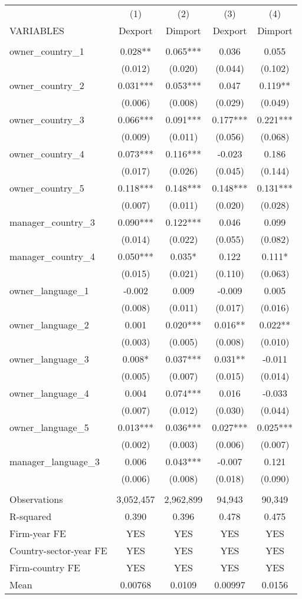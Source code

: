 \begin{tabular}{lcccc} \hline
 & (1) & (2) & (3) & (4) \\
VARIABLES & Dexport & Dimport & Dexport & Dimport \\ \hline
 &  &  &  &  \\
owner\_country\_1 & 0.028** & 0.065*** & 0.036 & 0.055 \\
 & (0.012) & (0.020) & (0.044) & (0.102) \\
owner\_country\_2 & 0.031*** & 0.053*** & 0.047 & 0.119** \\
 & (0.006) & (0.008) & (0.029) & (0.049) \\
owner\_country\_3 & 0.066*** & 0.091*** & 0.177*** & 0.221*** \\
 & (0.009) & (0.011) & (0.056) & (0.068) \\
owner\_country\_4 & 0.073*** & 0.116*** & -0.023 & 0.186 \\
 & (0.017) & (0.026) & (0.045) & (0.144) \\
owner\_country\_5 & 0.118*** & 0.148*** & 0.148*** & 0.131*** \\
 & (0.007) & (0.011) & (0.020) & (0.028) \\
manager\_country\_3 & 0.090*** & 0.122*** & 0.046 & 0.099 \\
 & (0.014) & (0.022) & (0.055) & (0.082) \\
manager\_country\_4 & 0.050*** & 0.035* & 0.122 & 0.111* \\
 & (0.015) & (0.021) & (0.110) & (0.063) \\
owner\_language\_1 & -0.002 & 0.009 & -0.009 & 0.005 \\
 & (0.008) & (0.011) & (0.017) & (0.016) \\
owner\_language\_2 & 0.001 & 0.020*** & 0.016** & 0.022** \\
 & (0.003) & (0.005) & (0.008) & (0.010) \\
owner\_language\_3 & 0.008* & 0.037*** & 0.031** & -0.011 \\
 & (0.005) & (0.007) & (0.015) & (0.014) \\
owner\_language\_4 & 0.004 & 0.074*** & 0.016 & -0.033 \\
 & (0.007) & (0.012) & (0.030) & (0.044) \\
owner\_language\_5 & 0.013*** & 0.036*** & 0.027*** & 0.025*** \\
 & (0.002) & (0.003) & (0.006) & (0.007) \\
manager\_language\_3 & 0.006 & 0.043*** & -0.007 & 0.121 \\
 & (0.006) & (0.008) & (0.018) & (0.090) \\
 &  &  &  &  \\
Observations & 3,052,457 & 2,962,899 & 94,943 & 90,349 \\
R-squared & 0.390 & 0.396 & 0.478 & 0.475 \\
Firm-year FE & YES & YES & YES & YES \\
Country-sector-year FE & YES & YES & YES & YES \\
Firm-country FE & YES & YES & YES & YES \\
 Mean & 0.00768 & 0.0109 & 0.00997 & 0.0156 \\ \hline
\end{tabular}
